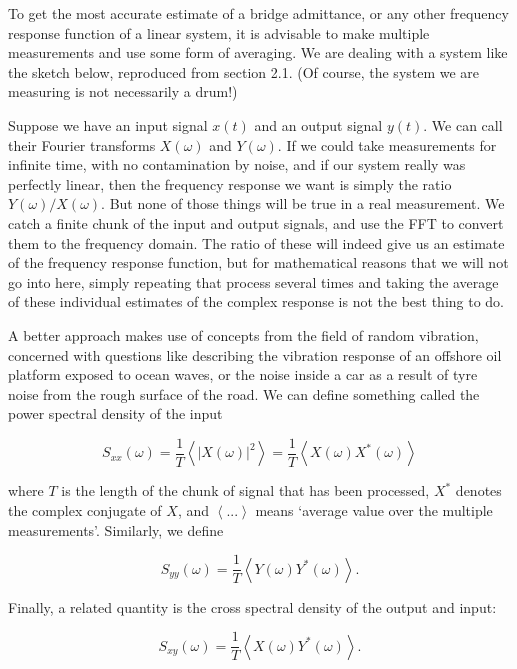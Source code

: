   To get the most accurate estimate of a bridge admittance, or any other 
  frequency response function of a linear system, it is advisable to make 
  multiple measurements and use some form of averaging. We are dealing with a 
  system like the sketch below, reproduced from section 2.1. (Of course, the 
  system we are measuring is not necessarily a drum!) 


  Suppose we have an input signal $x(t)$ and an output signal $y(t)$. We can 
  call their Fourier transforms $X(\omega)$ and $Y(\omega)$. If we could take 
  measurements for infinite time, with no contamination by noise, and if our 
  system really was perfectly linear, then the frequency response we want is 
  simply the ratio $Y(\omega)/X(\omega)$. But none of those things will be true 
  in a real measurement. We catch a finite chunk of the input and output 
  signals, and use the FFT to convert them to the frequency domain. The ratio 
  of these will indeed give us an estimate of the frequency response function, 
  but for mathematical reasons that we will not go into here, simply repeating 
  that process several times and taking the average of these individual 
  estimates of the complex response is not the best thing to do. 

  A better approach makes use of concepts from the field of random vibration, 
  concerned with questions like describing the vibration response of an 
  offshore oil platform exposed to ocean waves, or the noise inside a car as a 
  result of tyre noise from the rough surface of the road. We can define 
  something called the power spectral density of the input 

  $$S_{xx}(\omega) = \frac{1}{T}\left<|X(\omega)|^2 \right> = 
  \frac{1}{T}\left<X(\omega) X^*(\omega)\right> \tag{1}$$ 

  where $T$ is the length of the chunk of signal that has been processed, $X^*$ 
  denotes the complex conjugate of $X$, and $\left< ... \right>$ means `average 
  value over the multiple measurements'. Similarly, we define 

  $$S_{yy}(\omega) = \frac{1}{T}\left<Y(\omega) Y^*(\omega)\right> .\tag{2}$$ 

  Finally, a related quantity is the cross spectral density of the output and 
  input: 

  $$S_{xy}(\omega) = \frac{1}{T}\left<X(\omega) Y^*(\omega)\right> .\tag{3}$$ 

